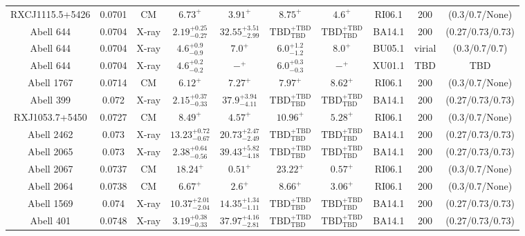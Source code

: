 \begin{table}
\begin{tabular}{cccccccccc}
RXCJ1115.5+5426 & 0.0701 & CM & ${6.73}^{+}_{}$ & ${3.91}^{+}_{}$ & ${8.75}^{+}_{}$ & ${4.6}^{+}_{}$ & RI06.1 & 200 & (0.3/0.7/None) \\
Abell 644 & 0.0704 & X-ray & ${2.19}^{+0.25}_{-0.27}$ & ${32.55}^{+3.51}_{-2.99}$ & ${\mathrm{TBD}}^{+\mathrm{TBD}}_{\mathrm{TBD}}$ & ${\mathrm{TBD}}^{+\mathrm{TBD}}_{\mathrm{TBD}}$ & BA14.1 & 200 & (0.27/0.73/0.73) \\
Abell 644 & 0.0704 & X-ray & ${4.6}^{+0.9}_{-0.9}$ & ${7.0}^{+}_{}$ & ${6.0}^{+1.2}_{-1.2}$ & ${8.0}^{+}_{}$ & BU05.1 & virial & (0.3/0.7/0.7) \\
Abell 644 & 0.0704 & X-ray & ${4.6}^{+0.2}_{-0.2}$ & ${-}^{+}_{}$ & ${6.0}^{+0.3}_{-0.3}$ & ${-}^{+}_{}$ & XU01.1 & TBD & TBD \\
Abell 1767 & 0.0714 & CM & ${6.12}^{+}_{}$ & ${7.27}^{+}_{}$ & ${7.97}^{+}_{}$ & ${8.62}^{+}_{}$ & RI06.1 & 200 & (0.3/0.7/None) \\
Abell 399 & 0.072 & X-ray & ${2.15}^{+0.37}_{-0.33}$ & ${37.9}^{+3.94}_{-4.11}$ & ${\mathrm{TBD}}^{+\mathrm{TBD}}_{\mathrm{TBD}}$ & ${\mathrm{TBD}}^{+\mathrm{TBD}}_{\mathrm{TBD}}$ & BA14.1 & 200 & (0.27/0.73/0.73) \\
RXJ1053.7+5450 & 0.0727 & CM & ${8.49}^{+}_{}$ & ${4.57}^{+}_{}$ & ${10.96}^{+}_{}$ & ${5.28}^{+}_{}$ & RI06.1 & 200 & (0.3/0.7/None) \\
Abell 2462 & 0.073 & X-ray & ${13.23}^{+0.72}_{-0.67}$ & ${20.73}^{+2.47}_{-2.49}$ & ${\mathrm{TBD}}^{+\mathrm{TBD}}_{\mathrm{TBD}}$ & ${\mathrm{TBD}}^{+\mathrm{TBD}}_{\mathrm{TBD}}$ & BA14.1 & 200 & (0.27/0.73/0.73) \\
Abell 2065 & 0.073 & X-ray & ${2.38}^{+0.64}_{-0.56}$ & ${39.43}^{+5.82}_{-4.18}$ & ${\mathrm{TBD}}^{+\mathrm{TBD}}_{\mathrm{TBD}}$ & ${\mathrm{TBD}}^{+\mathrm{TBD}}_{\mathrm{TBD}}$ & BA14.1 & 200 & (0.27/0.73/0.73) \\
Abell 2067 & 0.0737 & CM & ${18.24}^{+}_{}$ & ${0.51}^{+}_{}$ & ${23.22}^{+}_{}$ & ${0.57}^{+}_{}$ & RI06.1 & 200 & (0.3/0.7/None) \\
Abell 2064 & 0.0738 & CM & ${6.67}^{+}_{}$ & ${2.6}^{+}_{}$ & ${8.66}^{+}_{}$ & ${3.06}^{+}_{}$ & RI06.1 & 200 & (0.3/0.7/None) \\
Abell 1569 & 0.074 & X-ray & ${10.37}^{+2.01}_{-2.04}$ & ${14.35}^{+1.34}_{-1.11}$ & ${\mathrm{TBD}}^{+\mathrm{TBD}}_{\mathrm{TBD}}$ & ${\mathrm{TBD}}^{+\mathrm{TBD}}_{\mathrm{TBD}}$ & BA14.1 & 200 & (0.27/0.73/0.73) \\
Abell 401 & 0.0748 & X-ray & ${3.19}^{+0.38}_{-0.33}$ & ${37.97}^{+4.16}_{-2.81}$ & ${\mathrm{TBD}}^{+\mathrm{TBD}}_{\mathrm{TBD}}$ & ${\mathrm{TBD}}^{+\mathrm{TBD}}_{\mathrm{TBD}}$ & BA14.1 & 200 & (0.27/0.73/0.73) \\

\end{tabular}
\end{table}
